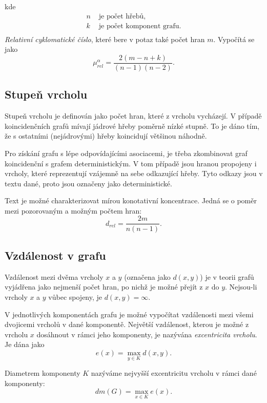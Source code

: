 \documentclass[dp.tex]{subfiles}
\begin{document}
kde
\begin{align*}
	n & \text{ je počet hřebů,}\\
	k & \text{ je počet komponent grafu.}\\
\end{align*}  
\textit{Relativní cyklomatické číslo}, které bere v potaz také počet hran $m$. Vypočítá se jako
\begin{equation}
\mu_\textit{rel}^\alpha=\frac{2(m-n+k)}{(n-1)(n-2)}.
\end{equation}

\subsection{Stupeň vrcholu}
Stupeň vrcholu je definován jako počet hran, které z vrcholu vycházejí. V případě koincidenčních grafů mívají jádrové hřeby poměrně nízké stupně. To je dáno tím, že s ostatními (nejádrovými) hřeby koincidují většinou náhodně.

Pro získání grafu s lépe odpovídajícími asociacemi, je třeba zkombinovat graf koincidenční s grafem deterministickým. V tom případě jsou hranou propojeny i vrcholy, které reprezentují vzájemně na sebe odkazující hřeby. Tyto odkazy jsou v textu dané, proto jsou označeny jako deterministické.

Text je možné charakterizovat mírou konotativní koncentrace. Jedná se o poměr mezi pozorovaným a možným počtem hran:
\begin{equation}
d_\textit{rel}=\frac{2m}{n(n-1)}.
\end{equation}

\subsection{Vzdálenost v grafu}
Vzdálenost mezi dvěma vrcholy $x$ a $y$ (označena jako $d(x,y)$) je v teorii grafů vyjádřena jako nejmenší počet hran, po nichž je možné přejít z $x$ do $y$. Nejsou-li vrcholy $x$ a $y$ vůbec spojeny, je $d(x,y)=\infty$.

V jednotlivých komponentách grafu je možné vypočítat vzdálenosti mezi všemi dvojicemi vrcholů v dané komponentě. Největší vzdálenost, kterou je možné z  vrcholu $x$ dosáhnout v rámci jeho komponenty, je nazývána \textit{excentricita vrcholu}. Je dána jako
\begin{equation}
e(x)=\max_{y \in K} d(x,y).
\end{equation}

Diametrem komponenty $K$ nazýváme nejvyšší excentricitu vrcholu v rámci dané komponenty:
\begin{equation}
dm(G)=\max_{x \in K} e(x).
\end{equation}
\end{document}
